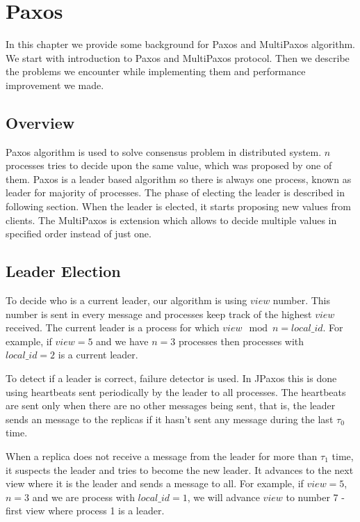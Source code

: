 \chapter{Paxos}

In this chapter we provide some background for Paxos and MultiPaxos algorithm. We start with introduction to Paxos and MultiPaxos protocol. Then we describe the problems we encounter while implementing them and performance improvement we made.

\section{Overview}
Paxos algorithm is used to solve consensus problem in distributed system. $n$ processes tries to decide upon the same value, which was proposed by one of them. Paxos is a leader based algorithm so there is always one process, known as leader for majority of processes. The phase of electing the leader is described in following section. When the leader is elected, it starts proposing new values from clients. The MultiPaxos is extension which allows to decide multiple values in specified order instead of just one.

\section{Leader Election}
\label{sec:leader_election}
\indent\par

To decide who is a current leader, our algorithm is using $view$ number. This number is sent in every message and processes keep track of the highest $view$ received. The current leader is a process for which $view \mod n = local\_id$. For example, if $view = 5$ and we have $n = 3$ processes then processes with $local\_id = 2$ is a current leader.

To detect if a leader is correct, failure detector is used. In JPaxos this is done using heartbeats sent periodically by the leader to all processes. The heartbeats are sent only when there are no other messages being sent, that is, the leader sends an \alive message to the replicas if it hasn't sent any message during the last $\tau_0$ time.

When a replica does not receive a message from the leader for more than $\tau_1$ time, it suspects the leader and tries to become the new leader. It advances to the next view where it is the leader and sends a \prepare message to all. For example, if $view = 5$, $n = 3$ and we are process with $local\_id = 1$, we will advance $view$ to number 7 - first view where process 1 is a leader.

